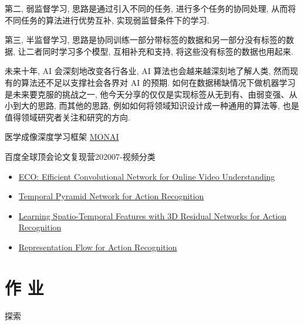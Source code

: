 第二, 弱监督学习, 思路是通过引入不同的任务, 进行多个任务的协同处理, 从而将不同任务的算法进行优势互补, 实现弱监督条件下的学习.

第三, 半监督学习, 思路是协同训练一部分带标签的数据和另一部分没有标签的数据, 让二者同时学习多个模型, 互相补充和支持, 将这些没有标签的数据也用起来.

未来十年, AI 会深刻地改变各行各业, AI 算法也会越来越深刻地了解人类, 然而现有的算法还不足以支撑社会各界对 AI 的预期. 如何在数据稀缺情况下做机器学习是未来要克服的挑战之一, 他今天分享的仅仅是实现标签从无到有、由弱变强、从小到大的思路, 而其他的思路, 例如如何将领域知识设计成一种通用的算法等, 也是值得领域研究者关注和研究的方向.

医学成像深度学习框架 \href{https://monai.io/}{MONAI}

百度全球顶会论文复现营202007-视频分类
\begin{itemize}
\item \href{https://arxiv.org/abs/1804.09066}{ECO: Efficient Convolutional Network for Online Video Understanding}
\item \href{https://arxiv.org/abs/2004.03548}{Temporal Pyramid Network for Action Recognition}
\item \href{https://arxiv.org/abs/1708.07632}{Learning Spatio-Temporal Features with 3D Residual Networks for Action Recognition}
\item \href{https://arxiv.org/abs/1810.01455v3}{Representation Flow for Action Recognition}
\end{itemize}

\section{作 业 }
\begin{custom}[explorecolor]{探索}

\end{custom}

\begin{think}

\end{think} 